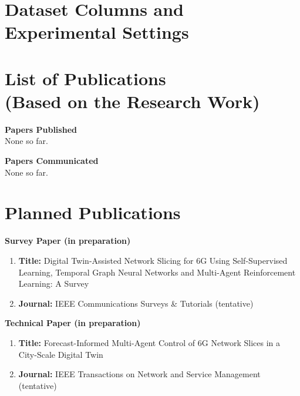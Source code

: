 \documentclass[a4paper, 12pt]{report}
\theoremstyle{definition}
\begin{document}
\chapter{Dataset Columns and Experimental Settings}


\newpage
\renewcommand{\bibname}{References}



\chapter*{List of Publications \\ \large(Based on the Research Work)}
\textbf{\Large Papers Published}\\
None so far.\vspace{0.4cm}

\noindent \textbf{\Large Papers Communicated}\\
None so far.

\clearpage
\chapter*{Planned Publications}
\noindent\textbf{\Large Survey Paper (in preparation)}
\begin{enumerate}
	\item \textbf{Title:} Digital Twin-Assisted Network Slicing for 6G Using Self-Supervised Learning, Temporal Graph Neural Networks and Multi-Agent Reinforcement Learning: A Survey
	\item \textbf{Journal:} IEEE Communications Surveys \& Tutorials (tentative)
\end{enumerate}
\vspace{0.6cm}

\noindent\textbf{\Large Technical Paper (in preparation)}
\begin{enumerate}
	\item \textbf{Title:} Forecast-Informed Multi-Agent Control of 6G Network Slices in a City-Scale Digital Twin
	\item \textbf{Journal:} IEEE Transactions on Network and Service Management (tentative)
\end{enumerate}
\end{document}
